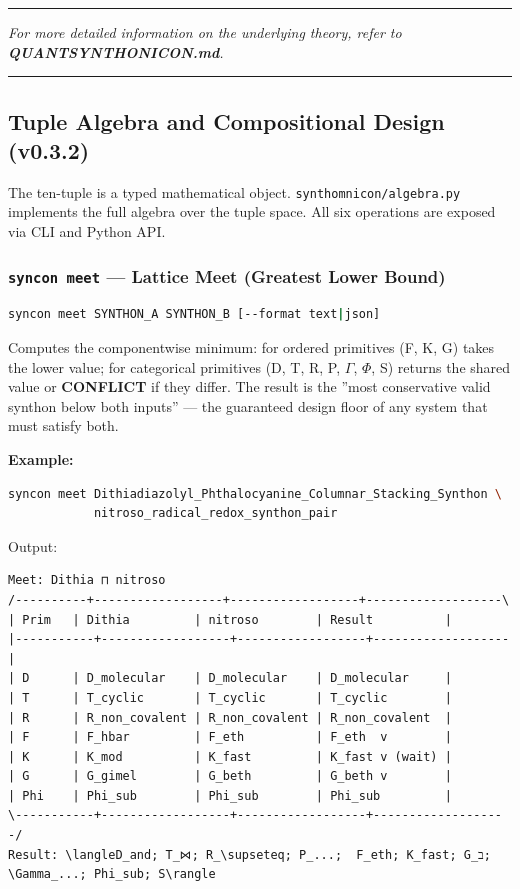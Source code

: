 \documentclass[12pt,a4paper]{article}
\begin{document}
\begin{center}
\rule{0.5\textwidth}{0.4pt}
\end{center}

\emph{For more detailed information on the underlying theory, refer to \textbf{QUANTSYNTHONICON.md}.}

\begin{center}
\rule{0.5\textwidth}{0.4pt}
\end{center}

\subsection{Tuple Algebra and Compositional Design (v0.3.2)}

The ten-tuple is a typed mathematical object. \texttt{synthomnicon/algebra.py} implements the full algebra over the tuple space. All six operations are exposed via CLI and Python API.

\subsubsection{\texttt{syncon meet} --- Lattice Meet (Greatest Lower Bound)}

\begin{lstlisting}[language=bash]
syncon meet SYNTHON_A SYNTHON_B [--format text|json]
\end{lstlisting}

Computes the componentwise minimum: for ordered primitives (F, K, G) takes the lower value; for categorical primitives (D, T, R, P, $\Gamma$, $\Phi$, S) returns the shared value or \textbf{CONFLICT} if they differ. The result is the ''most conservative valid synthon below both inputs'' --- the guaranteed design floor of any system that must satisfy both.

\textbf{Example:}

\begin{lstlisting}[language=bash]
syncon meet Dithiadiazolyl_Phthalocyanine_Columnar_Stacking_Synthon \
            nitroso_radical_redox_synthon_pair
\end{lstlisting}

Output:

\begin{lstlisting}
Meet: Dithia ⊓ nitroso
/----------+------------------+------------------+-------------------\
| Prim   | Dithia         | nitroso        | Result          |
|-----------+------------------+------------------+-------------------|
| D      | D_molecular    | D_molecular    | D_molecular     |
| T      | T_cyclic       | T_cyclic       | T_cyclic        |
| R      | R_non_covalent | R_non_covalent | R_non_covalent  |
| F      | F_hbar         | F_eth          | F_eth  v        |
| K      | K_mod          | K_fast         | K_fast v (wait) |
| G      | G_gimel        | G_beth         | G_beth v        |
| Phi    | Phi_sub        | Phi_sub        | Phi_sub         |
\-----------+------------------+------------------+-------------------/
Result: \langleD_and; T_⋈; R_\supseteq; P_...;  F_eth; K_fast; G_ב; \Gamma_...; Phi_sub; S\rangle
\end{lstlisting}
\end{document}
